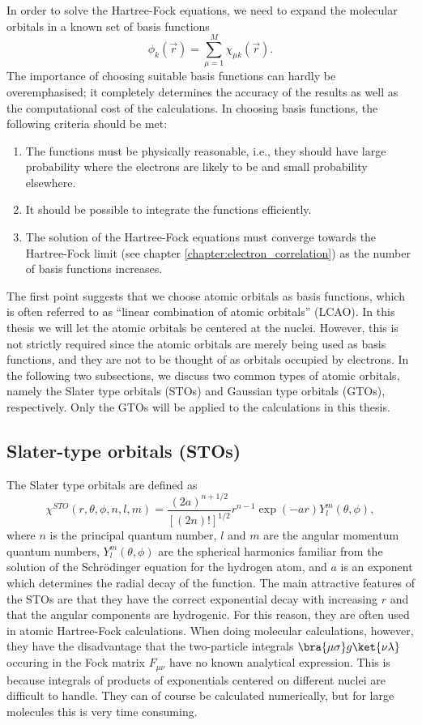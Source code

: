 In order to solve the Hartree-Fock equations, we need to expand the molecular orbitals in a known
set of basis functions
\begin{equation}
 \phi_k(\vec r) = \sum_{\mu=1}^M\chi_{\mu k}(\vec r).
\end{equation}
The importance of choosing suitable basis functions can hardly be overemphasised; it completely determines
the accuracy of the results as well as the computational cost of the calculations. In choosing basis functions,
the following criteria should be met:
\begin{enumerate}
 \item The functions must be physically reasonable, i.e., they should have large probability where
      the electrons are likely to be and small probability elsewhere.
 \item It should be possible to integrate the functions efficiently.
 \item The solution of the Hartree-Fock equations must converge towards the Hartree-Fock limit (see chapter \ref{chapter:electron_correlation})
       as the number of basis functions increases.
\end{enumerate}
The first point suggests that we choose atomic orbitals as basis functions,  which is often
referred to as ``linear combination of atomic orbitals'' (LCAO). In this thesis we will let the
atomic orbitals be centered at the nuclei. However, this is not strictly required since the
atomic orbitals are merely being used as basis functions, and they are not to be thought of
as orbitals occupied by electrons. In the following two subsections, we
discuss two common types of atomic orbitals, namely the Slater type orbitals (STOs) and
Gaussian type orbitals (GTOs), respectively. Only the GTOs will be applied to the 
calculations in this thesis.


\subsection{Slater-type orbitals (STOs)}
The Slater type orbitals are defined as \cite{Cramer}
\begin{equation}
 \chi^{STO}(r,\theta,\phi,n,l,m) = \frac{(2a)^{n+1/2}}{[(2n)!]^{1/2}}r^{n-1}\exp(-a r) Y^m_l(\theta,\phi),
\end{equation}
where $n$ is the principal quantum number, $l$ and $m$ are the angular momentum quantum numbers,
$Y^m_l(\theta,\phi)$ are the spherical harmonics familiar from the solution of the Schrödinger
equation for the hydrogen atom, and $a$ is an exponent which determines the radial decay of the
function. The main attractive features of the STOs are that they have the correct exponential decay with
increasing $r$ and that the angular components are hydrogenic. For this reason, they are often
used in atomic Hartree-Fock calculations. When doing molecular calculations, however, they have the
disadvantage that the two-particle integrals $\bra{\mu\sigma}g\ket{\nu\lambda}$ occuring in the
Fock matrix $F_{\mu\nu}$ have no known analytical expression. This is because integrals of products
of exponentials centered on different nuclei are difficult to handle. They can of course be calculated
numerically, but for large molecules this is very time consuming.

